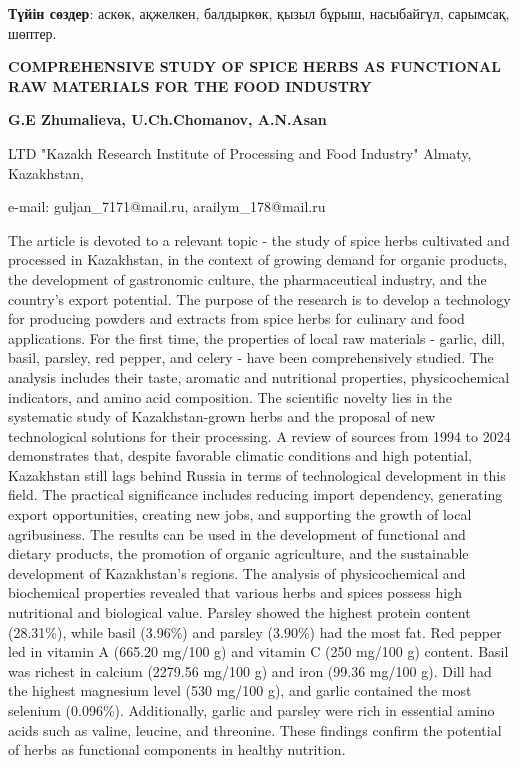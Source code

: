 {\bfseries Түйін сөздер}: аскөк, ақжелкен, балдыркөк, қызыл бұрыш,
насыбайгүл, сарымсақ, шөптер.

\begin{articleheader}
{\bfseries COMPREHENSIVE STUDY OF SPICE HERBS AS FUNCTIONAL RAW MATERIALS
FOR THE FOOD INDUSTRY}

{\bfseries
G.E Zhumalieva\textsuperscript{\envelope },
U.Ch.Chomanov,
A.N.Asan\textsuperscript{\envelope }
}
\end{articleheader}

\begin{affiliation}
LTD "Kazakh Research Institute of Processing and Food Industry" Almaty, Kazakhstan,

e-mail: guljan\_7171@mail.ru, arailym\_178@mail.ru
\end{affiliation}

The article is devoted to a relevant topic - the study of spice herbs
cultivated and processed in Kazakhstan, in the context of growing demand
for organic products, the development of gastronomic culture, the
pharmaceutical industry, and the country's export potential. The purpose
of the research is to develop a technology for producing powders and
extracts from spice herbs for culinary and food applications. For the
first time, the properties of local raw materials - garlic, dill, basil,
parsley, red pepper, and celery - have been comprehensively studied. The
analysis includes their taste, aromatic and nutritional properties,
physicochemical indicators, and amino acid composition. The scientific
novelty lies in the systematic study of Kazakhstan-grown herbs and the
proposal of new technological solutions for their processing. A review
of sources from 1994 to 2024 demonstrates that, despite favorable
climatic conditions and high potential, Kazakhstan still lags behind
Russia in terms of technological development in this field. The
practical significance includes reducing import dependency, generating
export opportunities, creating new jobs, and supporting the growth of
local agribusiness. The results can be used in the development of
functional and dietary products, the promotion of organic agriculture,
and the sustainable development of Kazakhstan's regions. The analysis of
physicochemical and biochemical properties revealed that various herbs
and spices possess high nutritional and biological value. Parsley showed
the highest protein content (28.31\%), while basil (3.96\%) and parsley
(3.90\%) had the most fat. Red pepper led in vitamin A (665.20 mg/100 g)
and vitamin C (250 mg/100 g) content. Basil was richest in calcium
(2279.56 mg/100 g) and iron (99.36 mg/100 g). Dill had the highest
magnesium level (530 mg/100 g), and garlic contained the most selenium
(0.096\%). Additionally, garlic and parsley were rich in essential amino
acids such as valine, leucine, and threonine. These findings confirm the
potential of herbs as functional components in healthy nutrition.

